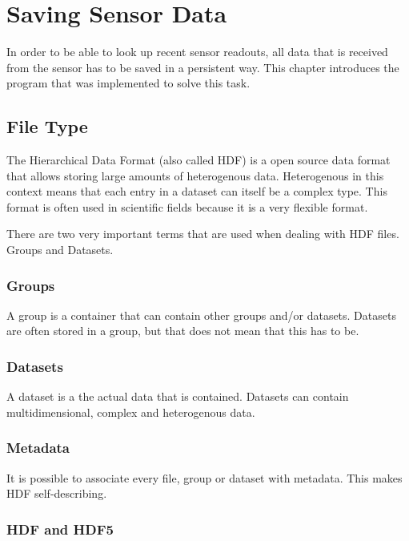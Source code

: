 \chapter{Saving Sensor Data}
\label{ch:faps-save}

\author{Nico Kratky}
%
In order to be able to look up recent sensor readouts, all data that is received from the sensor has to be saved in a persistent way. This chapter introduces the program that was implemented to solve this task.

\section{File Type}

The Hierarchical Data Format (also called HDF) is a open source data format that allows storing large amounts of heterogenous data. Heterogenous in this context means that each entry in a dataset can itself be a complex type. This
format is often used in scientific fields because it is a very flexible format.

There are two very important terms that are used when dealing with HDF files. Groups and Datasets.

\subsection{Groups}

A group is a container that can contain other groups and/or datasets. Datasets are often stored in a group, but that does not mean that this has to be.

\subsection{Datasets}

A dataset is a the actual data that is contained. Datasets can contain multidimensional, complex and heterogenous data.

\subsection{Metadata}

It is possible to associate every file, group or dataset with metadata. This makes HDF self-describing.

\subsection{HDF and HDF5}

